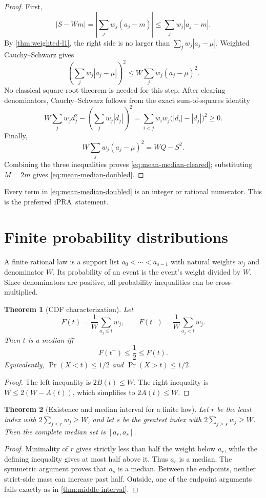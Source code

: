 \documentclass[11pt]{article}
\newtheorem{theorem}{Theorem}[section]
\newcommand{\iPRA}{\ensuremath{\mathrm{iPRA}}}
\newcommand{\abs}[1]{\left|#1\right|}
\begin{document}
\begin{proof}
First,
\[
 \abs{S-Wm}
 =\abs{\sum_jw_j(a_j-m)}
 \leq\sum_jw_j\abs{a_j-m}.
\]
By \cref{thm:weighted-l1}, the right side is no larger than
$\sum_jw_j\abs{a_j-\mu}$.  Weighted Cauchy--Schwarz gives
\[
 \left(\sum_jw_j\abs{a_j-\mu}\right)^2
 \leq W\sum_jw_j(a_j-\mu)^2.
\]
No classical square-root theorem is needed for this step.  After clearing
denominators, Cauchy--Schwarz follows from the exact sum-of-squares identity
\[
 W\sum_jw_jd_j^2-\left(\sum_jw_j\abs{d_j}\right)^2
 =\sum_{i<j}w_iw_j\bigl(\abs{d_i}-\abs{d_j}\bigr)^2\geq0.
\]
Finally,
\[
 W\sum_jw_j(a_j-\mu)^2=WQ-S^2.
\]
Combining the three inequalities proves \eqref{eq:mean-median-cleared};
substituting $M=2m$ gives \eqref{eq:mean-median-doubled}.
\end{proof}

Every term in \eqref{eq:mean-median-doubled} is an integer or rational
numerator.  This is the preferred \iPRA\ statement.

\section{Finite probability distributions}

A finite rational law is a support list $a_0<\cdots<a_{s-1}$ with natural
weights $w_j$ and denominator $W$.  Its probability of an event is the event's
weight divided by $W$.  Since denominators are positive, all probability
inequalities can be cross-multiplied.

\begin{theorem}[CDF characterization]\label{thm:cdf}
Let
\[
 F(t)=\frac1W\sum_{a_j\leq t}w_j,
 \qquad F(t^-)=\frac1W\sum_{a_j<t}w_j.
\]
Then $t$ is a median iff
\[
  F(t^-)\leq\frac12\leq F(t).
\]
Equivalently,
$\Pr(X<t)\leq1/2$ and $\Pr(X>t)\leq1/2$.
\end{theorem}

\begin{proof}
The left inequality is $2B(t)\leq W$.  The right inequality is
$W\leq2(W-A(t))$, which simplifies to $2A(t)\leq W$.
\end{proof}

\begin{theorem}[Existence and median interval for a finite law]
Let $r$ be the least index with
$2\sum_{j\leq r}w_j\geq W$, and let $s$ be the greatest index with
$2\sum_{j\geq s}w_j\geq W$.  Then the complete median set is
$[a_r,a_s]$.
\end{theorem}

\begin{proof}
Minimality of $r$ gives strictly less than half the weight below $a_r$, while
the defining inequality gives at most half above it.  Thus $a_r$ is a median.
The symmetric argument proves that $a_s$ is a median.  Between the endpoints,
neither strict-side mass can increase past half.  Outside, one of the endpoint
arguments fails exactly as in \cref{thm:middle-interval}.
\end{proof}
\end{document}
